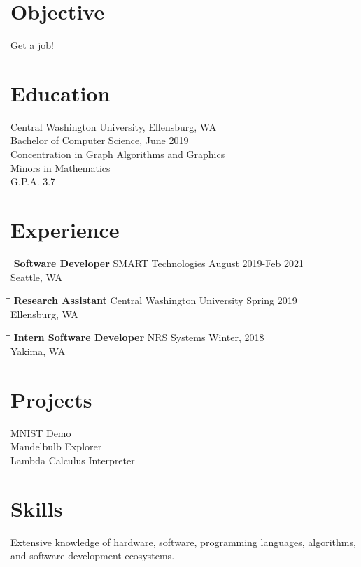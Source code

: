 \documentclass[a4]{article}
\begin{document}

\section*{Objective}
Get a job!

\section*{Education}
Central Washington University, Ellensburg, WA \\
Bachelor of Computer Science, June 2019 \\
Concentration in Graph Algorithms and Graphics \\
Minors in Mathematics \\
G.P.A. 3.7

\section*{Experience}
\vspace{-0.1in}
\begin{tabbing}
  \hspace{2.3in}\= \hspace{2.6in}\= \kill %
  {\bf Software Developer} \>SMART Technologies \>August 2019-Feb 2021\\
  \>Seattle, WA
\end{tabbing}\vspace{-20pt}      %
\lipsum[1][1-5]

\vspace{-0.1in}
\begin{tabbing}
  \hspace{2.3in}\= \hspace{2.6in}\= \kill %
  {\bf Research Assistant} \>Central Washington University \>Spring 2019\\
  \>Ellensburg, WA
\end{tabbing}\vspace{-20pt}      %
\lipsum[1][1-5]

\vspace{-0.1in}
\begin{tabbing}
  \hspace{2.3in}\= \hspace{2.6in}\= \kill %
  {\bf Intern Software Developer} \>NRS Systems \>Winter, 2018\\
  \>Yakima, WA
\end{tabbing}\vspace{-20pt}      %
\lipsum[1][1-3]

\section*{Projects}
MNIST Demo \\
Mandelbulb Explorer \\
Lambda Calculus Interpreter


\section*{Skills}
Extensive knowledge of hardware, software, programming languages, algorithms, and software development ecosystems.
\end{document}
